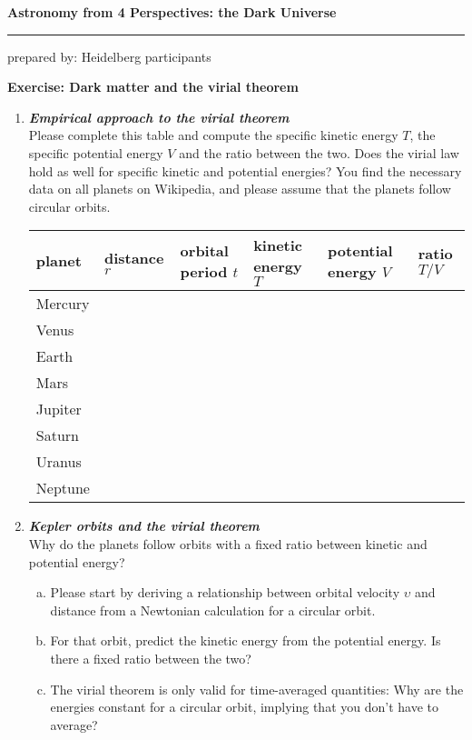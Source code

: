 \documentclass[a4paper,12pt]{article}
\newcommand{\question}[1]{\textbf{\textit{#1}}}
\newcommand{\HRule}{\rule{\linewidth}{0.3mm}}
\begin{document}
\pagestyle{empty}

\begin{center}
\LARGE \textbf{Astronomy from 4 Perspectives: the Dark Universe}
\HRule
\end{center}
\begin{flushright}
prepared by: Heidelberg participants
\end{flushright}
\begin{center}
{\Large \textbf{Exercise: Dark matter and the virial theorem}}
\end{center}
\vspace{5mm}

\begin{enumerate}

\item \question{Empirical approach to the virial theorem}\\
Please complete this table and compute the specific kinetic energy $T$, the specific potential energy $V$ and the ratio between the two. Does the virial law hold as well for specific kinetic and potential energies? You find the necessary data on all planets on Wikipedia, and please assume that the planets follow circular orbits.

\begin{table}[h]
\begin{center}
\begin{tabular}{|l|ll|ll|l|}
\hline
planet & distance $r$ & orbital period $t$ & kinetic energy $T$ & potential energy $V$ & ratio $T/V$\\
\hline
Mercury & & & & & \\
Venus & & & & & \\
Earth & & & & & \\
Mars & & & & & \\
Jupiter & & & & & \\
Saturn & & & & & \\
Uranus & & & & & \\
Neptune & & & & & \\
\hline
\end{tabular}
\end{center}
\end{table}

\item \question{Kepler orbits and the virial theorem}\\
Why do the planets follow orbits with a fixed ratio between kinetic and potential energy?
\begin{enumerate}[(a)]
\item{Please start by deriving a relationship between orbital velocity $\upsilon$ and distance from a Newtonian calculation for a circular orbit.}
\item{For that orbit, predict the kinetic energy from the potential energy. Is there a fixed ratio between the two?}
\item{The virial theorem is only valid for time-averaged quantities: Why are the energies constant for a circular orbit, implying that you don't have to average?}
\end{enumerate}



\end{enumerate}
\end{document}
